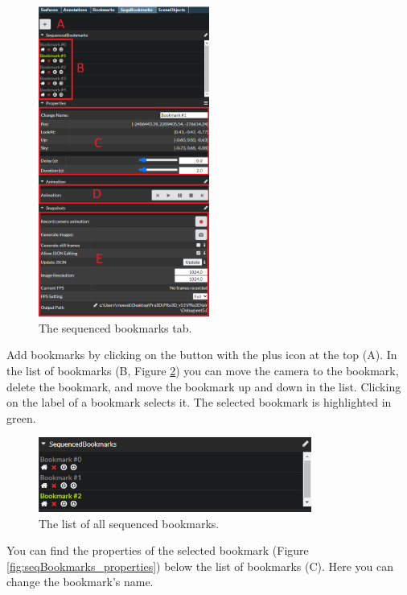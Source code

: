 \begin{figure}[h]
\centering
\includegraphics[width=0.5\textwidth]{pics/SequencedBookmarks.png}
\caption[Viewer Features Bookmarks]{The sequenced bookmarks tab.}
\label{fig:seqBookmarks}
\end{figure}

Add bookmarks by clicking on the button with the plus icon at the top (A). In the list of bookmarks (B, Figure \ref{fig:seqBookmarks_list}) you can move the camera to the bookmark, delete the bookmark, and move the bookmark up and down in the list. Clicking on the label of a bookmark selects it. The selected bookmark is highlighted in green.

\begin{figure}[h]
	\centering
	\includegraphics[width=0.8\textwidth]{pics/SequencedBookmarks_list.png}
	\caption[Viewer Features Bookmarks]{The list of all sequenced bookmarks.}
	\label{fig:seqBookmarks_list}
\end{figure}

You can find the properties of the selected bookmark (Figure \ref{fig:seqBookmarks_properties}) below the list of bookmarks (C). Here you can change the bookmark's name.

